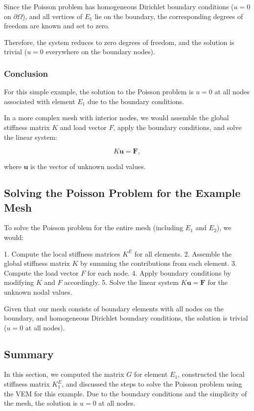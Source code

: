 \documentclass[class=article, crop=false]{standalone}
\begin{document}
Since the Poisson problem has homogeneous Dirichlet boundary conditions ($u = 0$ on $\partial\Omega$), and all vertices of $E_1$ lie on the boundary, the corresponding degrees of freedom are known and set to zero.

Therefore, the system reduces to zero degrees of freedom, and the solution is trivial ($u = 0$ everywhere on the boundary nodes).

\subsubsection{Conclusion}

For this simple example, the solution to the Poisson problem is $u = 0$ at all nodes associated with element $E_1$ due to the boundary conditions.

In a more complex mesh with interior nodes, we would assemble the global stiffness matrix $K$ and load vector $F$, apply the boundary conditions, and solve the linear system:

\[
K \mathbf{u} = \mathbf{F},
\]

where $\mathbf{u}$ is the vector of unknown nodal values.

\subsection{Solving the Poisson Problem for the Example Mesh}

To solve the Poisson problem for the entire mesh (including $E_1$ and $E_2$), we would:

1. Compute the local stiffness matrices $K^E$ for all elements.
2. Assemble the global stiffness matrix $K$ by summing the contributions from each element.
3. Compute the load vector $F$ for each node.
4. Apply boundary conditions by modifying $K$ and $F$ accordingly.
5. Solve the linear system $K \mathbf{u} = \mathbf{F}$ for the unknown nodal values.

Given that our mesh consists of boundary elements with all nodes on the boundary, and homogeneous Dirichlet boundary conditions, the solution is trivial ($u = 0$ at all nodes).

\subsection{Summary}

In this section, we computed the matrix $G$ for element $E_1$, constructed the local stiffness matrix $K_1^E$, and discussed the steps to solve the Poisson problem using the VEM for this example. Due to the boundary conditions and the simplicity of the mesh, the solution is $u = 0$ at all nodes.
\end{document}
